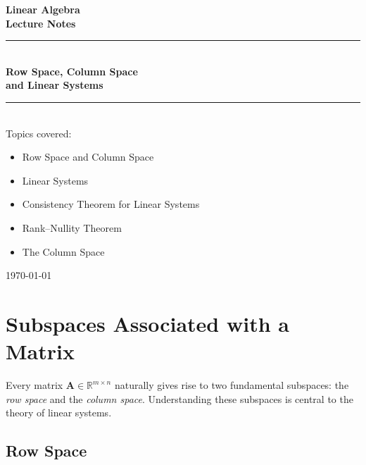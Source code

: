 \documentclass[12pt,a4paper]{article}
\newcommand{\R}{\mathbb{R}}
\newcommand{\mat}[1]{\mathbf{#1}}
\begin{document}
	
	\begin{titlepage}
		\centering
		\vspace*{3cm}
		{\Huge\bfseries\color{MidnightBlue} Linear Algebra\\[0.4em]
			\large\color{black} Lecture Notes}\\[1.5cm]
		\rule{0.6\linewidth}{0.8pt}\\[0.6cm]
		{\LARGE\bfseries Row Space, Column Space\\[0.3em] and Linear Systems}\\[0.4cm]
		\rule{0.6\linewidth}{0.8pt}\\[1.5cm]
		{\large Topics covered:}\\[0.5em]
		\begin{minipage}{0.55\linewidth}
			\begin{itemize}[leftmargin=1.5em, itemsep=4pt]
				\item Row Space and Column Space
				\item Linear Systems
				\item Consistency Theorem for Linear Systems
				\item Rank--Nullity Theorem
				\item The Column Space
			\end{itemize}
		\end{minipage}
		\vfill
		{\large \today}
	\end{titlepage}
	
	\tableofcontents
	\newpage
	
	\section{Subspaces Associated with a Matrix}
	
	Every matrix \(\mat{A} \in \R^{m \times n}\) naturally gives rise to two fundamental subspaces: the \emph{row space} and the \emph{column space}. Understanding these subspaces is central to the theory of linear systems.
	
	\subsection{Row Space}
	
\end{document}
